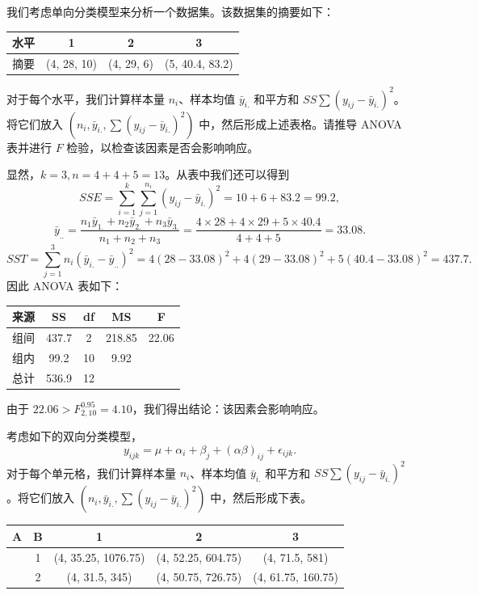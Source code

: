 \begin{questions}
\question
我们考虑单向分类模型来分析一个数据集。该数据集的摘要如下：

\begin{center}
\begin{tabular}{c|ccc}
水平 & 1 & 2 & 3 \\ \hline
摘要 & (4, 28, 10) & (4, 29, 6) & (5, 40.4, 83.2)
\end{tabular}
\end{center}
对于每个水平，我们计算样本量 $n_i$、样本均值 $\bar{y}_{i.}$ 和平方和 $SS \sum (y_{ij} - \bar{y}_{i.})^2$。将它们放入 $(n_i, \bar{y}_{i.}, \sum (y_{ij} - \bar{y}_{i.})^2)$ 中，然后形成上述表格。请推导 ANOVA 表并进行 $F$ 检验，以检查该因素是否会影响响应。

\begin{solution}
显然，$k = 3, n = 4 + 4 + 5 = 13$。从表中我们还可以得到
\[
SSE = \sum_{i=1}^k \sum_{j=1}^{n_i} (y_{ij} - \bar{y}_{i.})^2 = 10 + 6 + 83.2 = 99.2,
\]
\[
\bar{y}_{..} = \frac{n_1 \bar{y}_{1.} + n_2 \bar{y}_{2.} + n_3 \bar{y}_{3.}}{n_1 + n_2 + n_3} = \frac{4 \times 28 + 4 \times 29 + 5 \times 40.4}{4 + 4 + 5} = 33.08.
\]
\[
SST = \sum_{j=1}^3 n_i (\bar{y}_{i.} - \bar{y}_{..})^2 = 4(28 - 33.08)^2 + 4(29 - 33.08)^2 + 5(40.4 - 33.08)^2 = 437.7.
\]
因此 ANOVA 表如下：
\begin{center}
\begin{tabular}{c|cccc}
来源 & SS & df & MS & F \\ \hline
组间 & 437.7 & 2 & 218.85 & 22.06 \\
组内 & 99.2 & 10 & 9.92 & \\ \hline
总计 & 536.9 & 12 & & 
\end{tabular}
\end{center}
由于 $22.06 > F_{2,10}^{0.95} = 4.10$，我们得出结论：该因素会影响响应。
\end{solution}

\question
考虑如下的双向分类模型，
\[
y_{ijk} = \mu + \alpha_i + \beta_j + (\alpha\beta)_{ij} + \epsilon_{ijk}.
\]
对于每个单元格，我们计算样本量 $n_i$、样本均值 $\bar{y}_{i.}$ 和平方和 $SS \sum (y_{ij} - \bar{y}_{i.})^2$。将它们放入 $(n_i, \bar{y}_{i.}, \sum (y_{ij} - \bar{y}_{i.})^2)$ 中，然后形成下表。

\begin{center}
\begin{tabular}{cc|ccc}
A & B & 1 & 2 & 3 \\ \hline
& 1 & (4, 35.25, 1076.75) & (4, 52.25, 604.75) & (4, 71.5, 581) \\
& 2 & (4, 31.5, 345) & (4, 50.75, 726.75) & (4, 61.75, 160.75)
\end{tabular}
\end{center}


\end{questions}
